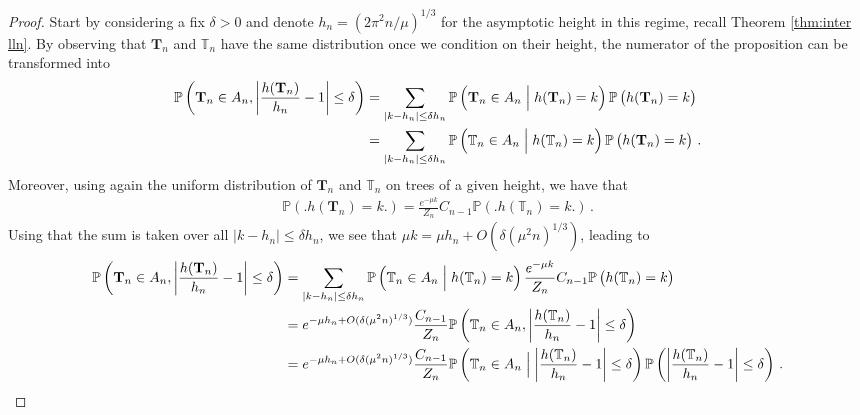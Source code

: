 \documentclass{article}
\newcommand{\pr}{\mathbb{P}}								%
\newcommand{\Prob}[1]{\pr\left(#1\right)}					%
\newcommand{\CProb}[2]{\pr\left(#1 \Bigm| #2\right)}	%
\newcommand{\1}{\mathbbm{1}}								%
\theoremstyle{definition}
\numberwithin{equation}{section}
\newcommand{\bT}{\mathbf T}
\newcommand{\T}{\mathbb T}
\begin{document}
\begin{proof}
    Start by considering a fix $\delta>0$ and denote $h_n=(2\pi^2n/\mu)^{1/3}$ for the asymptotic height in this regime, recall Theorem \ref{thm:inter lln}.
    By observing that $\bT_n$ and $\T_n$ have the same distribution once we condition on their height, the numerator of the proposition can be transformed into
    \begin{align*}
        \Prob{\bT_n\in A_n,\left|\frac{h(\bT_n)}{h_n}-1\right|\leq\delta}
        &=\sum_{|k-h_n|\leq\delta h_n}\CProb{\bT_n\in A_n}{h(\bT_n)=k}\Prob{\big.h(\bT_n)=k\big.}\\
        &=\sum_{|k-h_n|\leq\delta h_n}\CProb{\T_n\in A_n}{h(\T_n)=k}\Prob{\big.h(\bT_n)=k\big.}\,.
    \end{align*}
    Moreover, using again the uniform distribution of $\bT_n$ and $\T_n$ on trees of a given height, we have that
    \begin{align*}
        \Prob{\big.h(\bT_n)=k\big.}=\frac{e^{-\mu k}}{Z_n}C_{n-1}\Prob{\big.h(\T_n)=k\big.}\,.
    \end{align*}
    Using that the sum is taken over all $|k-h_n|\leq\delta h_n$, we see that $\mu k=\mu h_n+O(\delta(\mu^2n)^{1/3})$, leading to
    \begin{align*}
        \Prob{\bT_n\in A_n,\left|\frac{h(\bT_n)}{h_n}-1\right|\leq\delta}
        &=\sum_{|k-h_n|\leq\delta h_n}\CProb{\T_n\in A_n}{h(\T_n)=k}\frac{e^{-\mu k}}{Z_n}C_{n-1}\Prob{\big.h(\T_n)=k\big.}\\
        &=e^{-\mu h_n+O(\delta(\mu^2n)^{1/3})}\frac{C_{n-1}}{Z_n}\Prob{\T_n\in A_n,\left|\frac{h(\T_n)}{h_n}-1\right|\leq\delta}\\
        &=e^{-\mu h_n+O(\delta(\mu^2n)^{1/3})}\frac{C_{n-1}}{Z_n}\CProb{\T_n\in A_n}{\left|\frac{h(\T_n)}{h_n}-1\right|\leq\delta}\Prob{\left|\frac{h(\T_n)}{h_n}-1\right|\leq\delta}\,.
    \end{align*}


\end{proof}
\end{document}
